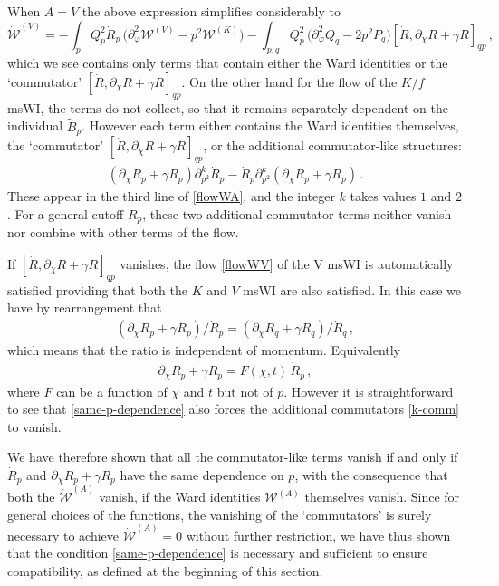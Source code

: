 \documentclass[11pt,draft]{book} %
\begin{document}
When $A = V$ the above expression simplifies considerably to
\begin{equation}
\label{flowWV}
	 \mathcal{\dot W}^{(V)}=-  \int_p  Q^2_p  \dot R_p\, \bigg( \partial^2_{\varphi} \mathcal{W}^{(V)}
	  - p^2  \mathcal{W}^{(K)} \bigg) - \int_{p,q}   Q^2_p\, \bigg(  \partial_{\varphi}^2 Q_q
	  - 2 p^2 P_q \bigg) [ \dot R , \partial_{\chi} R + \gamma R ]_{qp} \,,
\end{equation}
which we see contains only terms that contain either the Ward identities or the
`commutator' $[ \dot R , \partial_{\chi} R + \gamma R ]_{qp}$.
On the other hand for the flow of the $K/f$ msWI, the terms do not collect,
so that it remains separately dependent on the individual $\tilde B_p$.
However each term either contains the Ward identities themselves,
the `commutator'  $[ \dot R , \partial_{\chi} R + \gamma R ]_{qp}$,
or the additional commutator-like structures:
\begin{align}
  \label{k-comm}
  \left(\partial_\chi R_p + \gamma R_p\right) \partial_{p^2}^k \dot R_p - \dot R_p \partial_{p^2}^k \left(\partial_\chi R_p + \gamma R_p\right)\,.
\end{align}
These appear in the third line of \eqref{flowWA}, and the integer $k$ takes values $1$ and $2$.
For a general cutoff $R_p$, these two additional commutator terms neither vanish nor combine with
other terms of the flow.

If $[ \dot R , \partial_{\chi} R + \gamma R ]_{qp}$ vanishes,
the flow \eqref{flowWV} of the V msWI is automatically satisfied providing that both
the $K$ and $V$ msWI are also satisfied. In this case we have by rearrangement that
\begin{align}
  \left(
    \partial_\chi R_p + \gamma R_p
  \right)/\dot R_p = \left( \partial_\chi R_q + \gamma R_q \right)/\dot R_q\,,
\end{align}
which means that the ratio is independent of momentum. Equivalently
\begin{align}
  \label{same-p-dependence}
  \partial_\chi R_p + \gamma R_p = F(\chi,t) \,\dot R_p \,,
\end{align}
where $F$ can be a function of $\chi$ and $t$ but not of $p$.
However it is straightforward to see that \eqref{same-p-dependence} also forces the additional
commutators \eqref{k-comm} to vanish.

We have therefore shown that all the commutator-like terms vanish if and only if
$\dot R_p$ and $\partial_{\chi} R_p + \gamma R_p$ have the same dependence on $p$,
with the consequence  that both the $\mathcal{\dot W}^{(A)}$ vanish,
if the Ward identities $\mathcal{W}^{(A)}$ themselves vanish.
Since for general choices of the functions, the vanishing of the `commutators' is surely necessary
to achieve $\mathcal{\dot W}^{(A)}=0$ without further restriction,
we have thus shown that the condition \eqref{same-p-dependence} is necessary and sufficient to ensure
compatibility, as defined at the beginning of this section.
\end{document}
